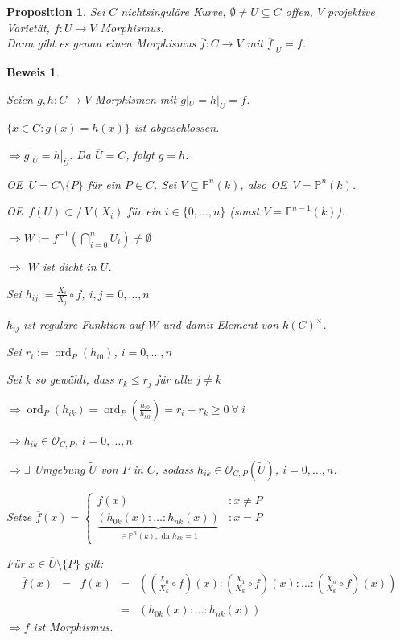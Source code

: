 \documentclass[a4paper, 12pt, numbers=noendperiod, chapterprefix=true]{scrbook}
\theoremstyle{break}
\newtheorem{Prop}[Def]{Proposition}
\theoremstyle{nonumberbreak}
\newtheorem{Bew}{Beweis}
\theoremstyle{nonumberplain}
\DeclareMathOperator{\ord}{ord}
\newcommand{\IP}{\mathbb{P}}%
\newcommand{\calO}{\mathcal{O}}
\newcommand{\X}{\times}
\renewcommand{\OE}{O\!\!E~}
\newcommand{\nsubset}{\subset\!\!\!\!\!/~}
\begin{document}
\begin{Prop}\label{20.9}
Sei $C$ nichtsingul\"are Kurve, $\emptyset\ne U\subseteq C$ offen, $V$ projektive Variet\"at, $f:U\to V$ Morphismus.\\
Dann gibt es genau einen Morphismus $\overline{f}:C\to V$ mit $\overline{f}|_U=f$.
\end{Prop}

\begin{Bew}\begin{description}[\setlabelstyle{\itshape}]
\item[Eindeutigkeit:] Seien $g,h:C\to V$ Morphismen mit $g|_U=h|_U=f$.

	$\{x\in C:g(x)=h(x)\}$ ist abgeschlossen.
	
	$\Rightarrow g|_{\overline U}=h|_{\overline U}$. Da $\overline U=C$, folgt $g=h$.
\item[Existenz:] \OE $U=C\setminus\{P\}$ f\"ur ein $P\in C$. Sei $V\subseteq\IP^n(k)$, also \OE $V=\IP^n(k)$.

	\OE $f(U)\nsubset V(X_i)$ f\"ur ein $i\in\{0,\ldots ,n\}$ (sonst $V=\IP^{n-1}(k)$).
	
	$\Rightarrow W:=f^{-1}(\bigcap\limits_{i=0}^n U_i) \ne \emptyset$
	
	$\Rightarrow$ $W$ ist dicht in $U$.
	
	Sei $h_{ij}:=\frac{X_i}{X_j}\circ f$, $i,j=0,\ldots ,n$
	
	$h_{ij}$ ist regul\"are Funktion auf $W$ und damit Element von $k(C)^\X$.
	
	Sei $r_i:=\ord_P(h_{i0})$, $i=0,\ldots ,n$
	
	Sei $k$ so gew\"ahlt, dass $r_k\le r_j$ f\"ur alle $j\ne k$
	
	$\Rightarrow \ord_P(h_{ik}) = \ord_P(\frac{h_{i0}}{h_{k0}}) = r_i-r_k \ge 0 \ \forall \ i$
	
	$\Rightarrow h_{ik}\in \calO_{C,P}$, $i=0,\ldots ,n$
	
	$\Rightarrow \exists$ Umgebung $\widetilde U$ von $P$ in $C$, sodass $h_{ik}\in \calO_{C,P}(\widetilde U)$, $i=0,\ldots ,n$.
	
	Setze $\overline f(x)=\left\{\begin{array}{lr}f(x) & :x\ne P\\ \underbrace{(h_{0k}(x):\ldots:h_{nk}(x))}_{\in\IP^n(k), \text{ da } h_{kk}=1} & :x=P \end{array}\right.$
	
	F\"ur $x\in \overline U\setminus\{P\}$ gilt:
	\[\begin{array}{rrrrl}
	\overline f(x) &=& f(x) &=& \left( \left( \frac{X_0}{X_k}\circ f \right) (x) : \left( \frac{X_1}{X_k}\circ f \right) (x) : \ldots : \left( \frac{X_n}{X_k}\circ f \right) (x) \right)\\
	&&&&\\
	&&&=& (h_{0k}(x):\ldots :h_{nk}(x))\end{array}\]
	$\Rightarrow \overline f$ ist Morphismus.
\end{description}\end{Bew}
\end{document}
